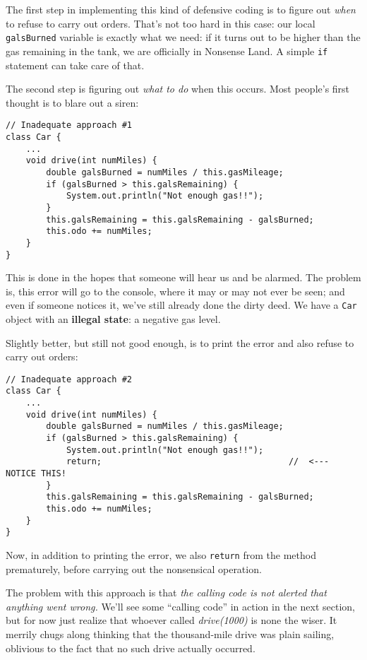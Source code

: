 The first step in implementing this kind of defensive coding is to figure out
\textit{when} to refuse to carry out orders. That's not too hard in this case:
our local \texttt{galsBurned} variable is exactly what we need: if it turns
out to be higher than the gas remaining in the tank, we are officially in
Nonsense Land. A simple \texttt{if} statement can take care of that.

The second step is figuring out \textit{what to do} when this occurs. Most
people's first thought is to blare out a siren:

\begin{Verbatim}[samepage=true,fontsize=\scriptsize,frame=single]
// Inadequate approach #1
class Car {
    ...
    void drive(int numMiles) {
        double galsBurned = numMiles / this.gasMileage;
        if (galsBurned > this.galsRemaining) {
            System.out.println("Not enough gas!!");
        }
        this.galsRemaining = this.galsRemaining - galsBurned;
        this.odo += numMiles;
    }
}
\end{Verbatim}

This is done in the hopes that someone will hear us and be alarmed. The
problem is, this error will go to the console, where it may or may not ever be
seen; and even if someone notices it, we've still already done the dirty deed.
We have a \texttt{Car} object with an \textbf{illegal state}: a negative gas
level.

Slightly better, but still not good enough, is to print the error and also
refuse to carry out orders:

\begin{Verbatim}[samepage=true,fontsize=\scriptsize,frame=single]
// Inadequate approach #2
class Car {
    ...
    void drive(int numMiles) {
        double galsBurned = numMiles / this.gasMileage;
        if (galsBurned > this.galsRemaining) {
            System.out.println("Not enough gas!!");
            return;                                     //  <---  NOTICE THIS!
        }
        this.galsRemaining = this.galsRemaining - galsBurned;
        this.odo += numMiles;
    }
}
\end{Verbatim}

Now, in addition to printing the error, we also \texttt{return} from the
method prematurely, before carrying out the nonsensical operation.

The problem with this approach is that \textit{the calling code is not alerted
that anything went wrong.} We'll see some ``calling code'' in action in the
next section, but for now just realize that whoever called
\textit{drive(1000)} is none the wiser. It merrily chugs along thinking that
the thousand-mile drive was plain sailing, oblivious to the fact that no such
drive actually occurred.

